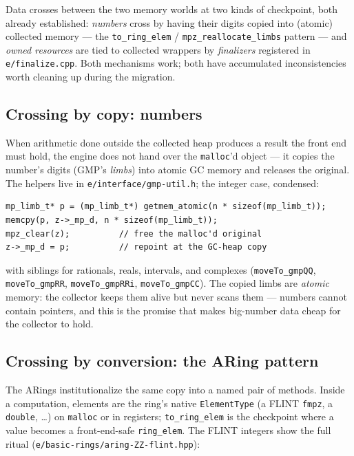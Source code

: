 \documentclass[11pt,oneside]{report}
\newcommand{\code}[1]{\textcolor{m2code}{\texttt{#1}}}
\newcommand{\file}[1]{\textcolor{m2file}{\texttt{#1}}}
\begin{document}
\begin{inbrief}
Data crosses between the two memory worlds at two kinds of checkpoint,
both already established: \emph{numbers} cross by having their digits
copied into (atomic) collected memory --- the \code{to\_ring\_elem} /
\code{mpz\_reallocate\_limbs} pattern --- and \emph{owned resources} are
tied to collected wrappers by \emph{finalizers} registered in
\file{e/finalize.cpp}. Both mechanisms work; both have accumulated
inconsistencies worth cleaning up during the migration.
\end{inbrief}

\subsection{Crossing by copy: numbers}
\label{sec:limbcopy}

When arithmetic done outside the collected heap produces a result the front
end must hold, the engine does not hand over the \code{malloc}'d object ---
it copies the number's digits (GMP's \emph{limbs}) into atomic GC memory
and releases the original. The helpers live in
\file{e/interface/gmp-util.h}; the integer case, condensed:

\begin{lstlisting}
mp_limb_t* p = (mp_limb_t*) getmem_atomic(n * sizeof(mp_limb_t));
memcpy(p, z->_mp_d, n * sizeof(mp_limb_t));
mpz_clear(z);          // free the malloc'd original
z->_mp_d = p;          // repoint at the GC-heap copy
\end{lstlisting}

\noindent with siblings for rationals, reals, intervals, and complexes
(\code{moveTo\_gmpQQ}, \code{moveTo\_gmpRR}, \code{moveTo\_gmpRRi},
\code{moveTo\_gmpCC}). The copied limbs are \emph{atomic} memory: the
collector keeps them alive but never scans them --- numbers cannot contain
pointers, and this is the promise that makes big-number data cheap for the
collector to hold.

\subsection{Crossing by conversion: the ARing pattern}
\label{sec:aringborder}

The ARings institutionalize the same copy into a named pair of methods.
Inside a computation, elements are the ring's native \code{ElementType}
(a FLINT \code{fmpz}, a \code{double}, \ldots) on \code{malloc} or in
registers; \code{to\_ring\_elem} is the checkpoint where a value becomes a
front-end-safe \code{ring\_elem}. The FLINT integers show the full ritual
(\file{e/basic-rings/aring-ZZ-flint.hpp}):
\end{document}
